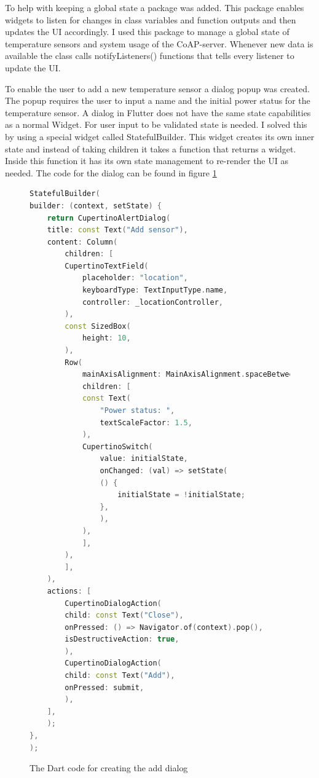 To help with keeping a global state a package\cite{provider} was added. This package enables widgets to listen for changes in class variables and function outputs and then updates the UI accordingly. I used this package to manage a global state of temperature sensors and system usage of the CoAP-server. Whenever new data is available the class calls notifyListeners() functions that tells every listener to update the UI.

To enable the user to add a new temperature sensor a dialog popup was created. The popup requires the user to input a name and the initial power status for the temperature sensor. A dialog in Flutter does not have the same state capabilities as a normal Widget. For user input to be validated state is needed. I solved this by using a special widget called StatefulBuilder. This widget creates its own inner state and instead of taking children it takes a function that returns a widget. Inside this function it has its own state management to re-render the UI as needed. The code for the dialog can be found in figure \ref{code:app:add}

\begin{figure}[H]
    \begin{lstlisting}[language=c++]
StatefulBuilder(
builder: (context, setState) {
    return CupertinoAlertDialog(
    title: const Text("Add sensor"),
    content: Column(
        children: [
        CupertinoTextField(
            placeholder: "location",
            keyboardType: TextInputType.name,
            controller: _locationController,
        ),
        const SizedBox(
            height: 10,
        ),
        Row(
            mainAxisAlignment: MainAxisAlignment.spaceBetween,
            children: [
            const Text(
                "Power status: ",
                textScaleFactor: 1.5,
            ),
            CupertinoSwitch(
                value: initialState,
                onChanged: (val) => setState(
                () {
                    initialState = !initialState;
                },
                ),
            ),
            ],
        ),
        ],
    ),
    actions: [
        CupertinoDialogAction(
        child: const Text("Close"),
        onPressed: () => Navigator.of(context).pop(),
        isDestructiveAction: true,
        ),
        CupertinoDialogAction(
        child: const Text("Add"),
        onPressed: submit,
        ),
    ],
    );
},
);
    \end{lstlisting}
    \caption{The Dart code for creating the add dialog}
    \label{code:app:add}
\end{figure}

